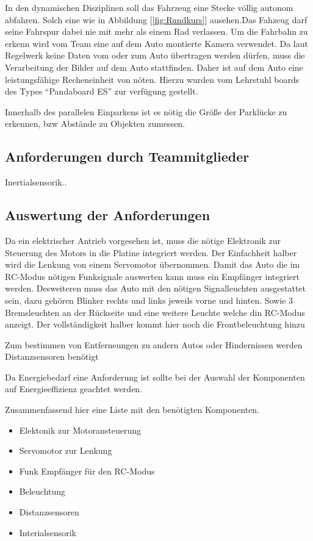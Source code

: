 In den dynamischen Disziplinen soll das Fahrzeug eine Stecke völlig autonom abfahren. Solch eine wie in Abbildung [\ref{fig:Rundkurs}] ausehen.Das Fahzeug darf seine
Fahrspur dabei nie mit mehr als einem Rad verlassen. Um die Fahrbahn zu erkenn wird vom Team eine auf dem Auto montierte Kamera verwendet. Da laut Regelwerk keine
Daten vom oder zum Auto übertragen werden dürfen, muss die Verarbeitung der Bilder auf dem Auto stattfinden. Daher ist auf dem Auto eine leistungsfähige Recheneinheit
von nöten. Hierzu wurden vom Lehrstuhl boards des Types ``Pandaboard ES'' zur verfügung gestellt. 

Innerhalb des parallelen Einparkens ist es nötig die Größe der Parklücke zu erkennen, bzw Abstände zu Objekten zumessen.

\subsection{Anforderungen durch Teammitglieder}
Inertialsensorik..


\subsection{Auswertung der Anforderungen}
Da ein elektrischer Antrieb vorgesehen ist, muss die nötige Elektronik zur Steuerung des Motors in die Platine integriert werden.
Der Einfachheit halber wird die Lenkung von einem Servomotor übernommen.
Damit das Auto die im RC-Modus nötigen Funksignale auswerten kann muss ein Empfänger integriert werden.
Desweiteren muss das Auto mit den nötigen Signalleuchten ausgestattet sein, dazu gehören Blinker rechts und links jeweils vorne und hinten.
Sowie 3 Bremsleuchten an der Rückseite und eine weitere Leuchte welche din RC-Modus anzeigt. Der vollständigkeit halber kommt hier noch die
Frontbeleuchtung hinzu

Zum bestimmen von Entferneungen zu andern Autos oder Hindernissen werden Distanzsensoren benötigt

Da Energiebedarf eine Anforderung ist sollte bei der Auswahl der Komponenten auf Energieeffizienz geachtet werden.

Zusammenfassend hier eine Liste mit den benötigten Komponenten.

\begin{itemize}
 \item Elektonik zur Motoransteuerung
 \item Servomotor zur Lenkung
 \item Funk Empfänger für den RC-Modus
 \item Beleuchtung
 \item Distanzsensoren
 \item Interialsensorik
\end{itemize}








